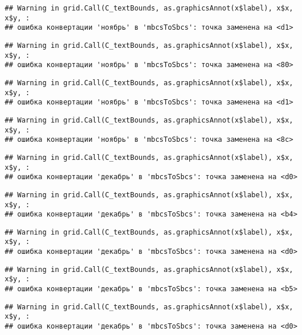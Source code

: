 \documentclass[
]{article}
\begin{document}
\begin{verbatim}
## Warning in grid.Call(C_textBounds, as.graphicsAnnot(x$label), x$x, x$y, :
## ошибка конвертации 'ноябрь' в 'mbcsToSbcs': точка заменена на <d1>
\end{verbatim}

\begin{verbatim}
## Warning in grid.Call(C_textBounds, as.graphicsAnnot(x$label), x$x, x$y, :
## ошибка конвертации 'ноябрь' в 'mbcsToSbcs': точка заменена на <80>
\end{verbatim}

\begin{verbatim}
## Warning in grid.Call(C_textBounds, as.graphicsAnnot(x$label), x$x, x$y, :
## ошибка конвертации 'ноябрь' в 'mbcsToSbcs': точка заменена на <d1>
\end{verbatim}

\begin{verbatim}
## Warning in grid.Call(C_textBounds, as.graphicsAnnot(x$label), x$x, x$y, :
## ошибка конвертации 'ноябрь' в 'mbcsToSbcs': точка заменена на <8c>
\end{verbatim}

\begin{verbatim}
## Warning in grid.Call(C_textBounds, as.graphicsAnnot(x$label), x$x, x$y, :
## ошибка конвертации 'декабрь' в 'mbcsToSbcs': точка заменена на <d0>
\end{verbatim}

\begin{verbatim}
## Warning in grid.Call(C_textBounds, as.graphicsAnnot(x$label), x$x, x$y, :
## ошибка конвертации 'декабрь' в 'mbcsToSbcs': точка заменена на <b4>
\end{verbatim}

\begin{verbatim}
## Warning in grid.Call(C_textBounds, as.graphicsAnnot(x$label), x$x, x$y, :
## ошибка конвертации 'декабрь' в 'mbcsToSbcs': точка заменена на <d0>
\end{verbatim}

\begin{verbatim}
## Warning in grid.Call(C_textBounds, as.graphicsAnnot(x$label), x$x, x$y, :
## ошибка конвертации 'декабрь' в 'mbcsToSbcs': точка заменена на <b5>
\end{verbatim}

\begin{verbatim}
## Warning in grid.Call(C_textBounds, as.graphicsAnnot(x$label), x$x, x$y, :
## ошибка конвертации 'декабрь' в 'mbcsToSbcs': точка заменена на <d0>
\end{verbatim}
\end{document}
